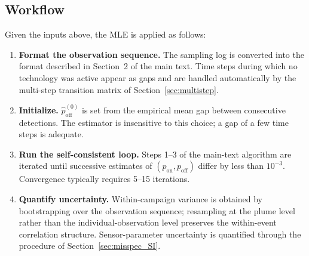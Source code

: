 \documentclass[11pt]{article}
\newcommand{\new}[1]{{\color{blue}#1}}
\begin{document}
\subsection{Workflow}
\new{Given the inputs above, the MLE is applied as follows:
\begin{enumerate}
    \item \textbf{Format the observation sequence.} The sampling log is converted into the format described in Section~2 of the main text. Time steps during which no technology was active appear as gaps and are handled automatically by the multi-step transition matrix of Section~\ref{sec:multistep}.
    \item \textbf{Initialize.} $\hat p_{\text{off}}^{(0)}$ is set from the empirical mean gap between consecutive detections. The estimator is insensitive to this choice; a gap of a few time steps is adequate.
    \item \textbf{Run the self-consistent loop.} Steps 1--3 of the main-text algorithm are iterated until successive estimates of $(p_{\text{on}}, p_{\text{off}})$ differ by less than $10^{-3}$. Convergence typically requires 5--15 iterations.
    \item \textbf{Quantify uncertainty.} Within-campaign variance is obtained by bootstrapping over the observation sequence; resampling at the plume level rather than the individual-observation level preserves the within-event correlation structure. Sensor-parameter uncertainty is quantified through the procedure of Section~\ref{sec:misspec_SI}.
\end{enumerate}}
\end{document}
